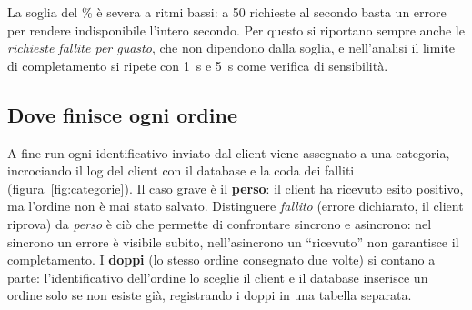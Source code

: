 La soglia del \% è severa a ritmi bassi: a 50 richieste al secondo basta un errore per rendere indisponibile l'intero secondo. Per questo si riportano sempre anche le \emph{richieste fallite per guasto}, che non dipendono dalla soglia, e nell'analisi il limite di completamento si ripete con 1~s e 5~s come verifica di sensibilità.

\subsection{Dove finisce ogni ordine}

A fine run ogni identificativo inviato dal client viene assegnato a una categoria, incrociando il log del client con il database e la coda dei falliti (figura~\ref{fig:categorie}). Il caso grave è il \textbf{perso}: il client ha ricevuto esito positivo, ma l'ordine non è mai stato salvato. Distinguere \emph{fallito} (errore dichiarato, il client riprova) da \emph{perso} è ciò che permette di confrontare sincrono e asincrono: nel sincrono un errore è visibile subito, nell'asincrono un ``ricevuto'' non garantisce il completamento. I \textbf{doppi} (lo stesso ordine consegnato due volte) si contano a parte: l'identificativo dell'ordine lo sceglie il client e il database inserisce un ordine solo se non esiste già, registrando i doppi in una tabella separata.

